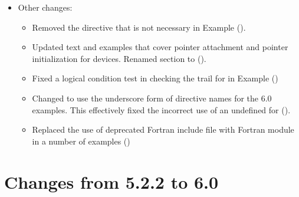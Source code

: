 \begin{itemize}
\item Other changes:
\begin{itemize}
  \item Removed the  directive that is not necessary
    in Example  ().
  \item Updated text and examples that cover pointer attachment and pointer
    initialization for devices. Renamed  section
    to 
    ().
  \item Fixed a logical condition test in checking the  trail
    for  in Example 
    ()
  \item Changed to use the underscore form of directive names for the 6.0
    examples. This effectively fixed the incorrect use of an undefined 
     for 
    ().
  \item Replaced the use of deprecated Fortran include file 
    with Fortran module  in a number of examples
    ()
\end{itemize}

\end{itemize}

\section{Changes from 5.2.2 to 6.0}
\label{sec:history_522_to_60}

